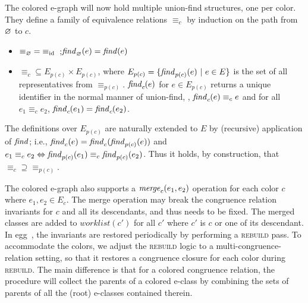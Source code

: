 \smallskip
The colored e-graph will now hold multiple union-find structures, one per color.
They define a family of equivalence relations $\equiv_{c}$ by induction
on the path from $\varnothing$ to $c$.

\begin{itemize}
    \item ${\equiv_{\varnothing}} = {\equiv_{\mathrm{id}}}$~;\quad $\mathit{find}_{\varnothing}(e) = \mathit{find}(e)$
    \item ${\equiv_c} \subseteq E_{p(c)}\times E_{p(c)}$, where
      $E_{p(c)}=\{\mathit{find}_{p(c)}(e)~|~e\in E\}$ is the set of all representatives from $\equiv_{p(c)}$. $\mathit{find}_c\hspace{-0.5pt}(e)$ for $e\in E_{p(c)}$ returns a unique identifier in the normal manner of union-find, \ie, $\mathit{find}_c\hspace{-0.5pt}(e) \equiv_c e$  and for all $e_1 \equiv_c e_2$, $\mathit{find}_c\hspace{-0.5pt}(e_1) = \mathit{find}_c\hspace{-0.5pt}(e_2)$.
\end{itemize}


\begin{comment}
Formalize the colored-rebuild algorithm
This should include an algorithmic description of normal rebuild
Then we would use functions to use the same algorithm for colored rebuild.
The main concerns that change are:
1. Collecting all the parents
2. Updating the memo
\end{comment}

The definitions over $E_{p(c)}$ are naturally extended to $E$ by (recursive) application of $\mathit{find}$; i.e., $\mathit{find}_c(e) = \mathit{find}_c(\mathit{find}_{p(c)}(e))$
and $e_1 \equiv_c e_2 \Leftrightarrow \mathit{find}_{p(c)}(e_1) \equiv_c \mathit{find}_{p(c)}(e_2)$.
Thus it holds, by construction, that
${\equiv_{c}} \supseteq {\equiv_{p(c)}}$.

The colored e-graph also supports a $\mathit{merge}_c(e_1, e_2)$ operation for each color $c$ where $e_1, e_2 \in E_c$.
The merge operation may break the congruence relation invariants for $c$ and all its descendants, and thus needs to be fixed.
The merged classes are added to $\mathit{worklist}(c')$ for all $c'$ where $c'$ is $c$ or one of its descendant.
In egg~\cite{egg}, the invariants are restored periodically by performing a \textsc{rebuild} pass.
To accommodate the colors, we adjust the
\textsc{rebuild} logic to a multi-congruence-relation setting,
so that it restores a congruence closure for each color during \textsc{rebuild}.
The main difference is that for a colored congruence relation, the procedure will collect the parents of a colored e-class by combining the sets of parents of all the (root) e-classes contained therein.


